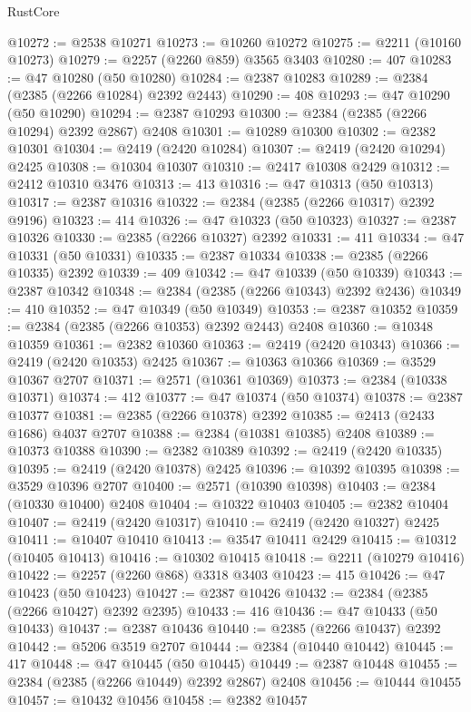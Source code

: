 \begin{lexlean}{RustCore}
\begin{coremodule}
@10272 := @2538 @10271
@10273 := @10260 @10272
@10275 := @2211 (@10160 @10273)
@10279 := @2257 (@2260 @859) @3565 @3403
@10280 := 407
@10283 := @47 @10280 (@50 @10280)
@10284 := @2387 @10283
@10289 := @2384 (@2385 (@2266 @10284) @2392 @2443)
@10290 := 408
@10293 := @47 @10290 (@50 @10290)
@10294 := @2387 @10293
@10300 := @2384 (@2385 (@2266 @10294) @2392 @2867) @2408
@10301 := @10289 @10300
@10302 := @2382 @10301
@10304 := @2419 (@2420 @10284)
@10307 := @2419 (@2420 @10294) @2425
@10308 := @10304 @10307
@10310 := @2417 @10308 @2429
@10312 := @2412 @10310 @3476
@10313 := 413
@10316 := @47 @10313 (@50 @10313)
@10317 := @2387 @10316
@10322 := @2384 (@2385 (@2266 @10317) @2392 @9196)
@10323 := 414
@10326 := @47 @10323 (@50 @10323)
@10327 := @2387 @10326
@10330 := @2385 (@2266 @10327) @2392
@10331 := 411
@10334 := @47 @10331 (@50 @10331)
@10335 := @2387 @10334
@10338 := @2385 (@2266 @10335) @2392
@10339 := 409
@10342 := @47 @10339 (@50 @10339)
@10343 := @2387 @10342
@10348 := @2384 (@2385 (@2266 @10343) @2392 @2436)
@10349 := 410
@10352 := @47 @10349 (@50 @10349)
@10353 := @2387 @10352
@10359 := @2384 (@2385 (@2266 @10353) @2392 @2443) @2408
@10360 := @10348 @10359
@10361 := @2382 @10360
@10363 := @2419 (@2420 @10343)
@10366 := @2419 (@2420 @10353) @2425
@10367 := @10363 @10366
@10369 := @3529 @10367 @2707
@10371 := @2571 (@10361 @10369)
@10373 := @2384 (@10338 @10371)
@10374 := 412
@10377 := @47 @10374 (@50 @10374)
@10378 := @2387 @10377
@10381 := @2385 (@2266 @10378) @2392
@10385 := @2413 (@2433 @1686) @4037 @2707
@10388 := @2384 (@10381 @10385) @2408
@10389 := @10373 @10388
@10390 := @2382 @10389
@10392 := @2419 (@2420 @10335)
@10395 := @2419 (@2420 @10378) @2425
@10396 := @10392 @10395
@10398 := @3529 @10396 @2707
@10400 := @2571 (@10390 @10398)
@10403 := @2384 (@10330 @10400) @2408
@10404 := @10322 @10403
@10405 := @2382 @10404
@10407 := @2419 (@2420 @10317)
@10410 := @2419 (@2420 @10327) @2425
@10411 := @10407 @10410
@10413 := @3547 @10411 @2429
@10415 := @10312 (@10405 @10413)
@10416 := @10302 @10415
@10418 := @2211 (@10279 @10416)
@10422 := @2257 (@2260 @868) @3318 @3403
@10423 := 415
@10426 := @47 @10423 (@50 @10423)
@10427 := @2387 @10426
@10432 := @2384 (@2385 (@2266 @10427) @2392 @2395)
@10433 := 416
@10436 := @47 @10433 (@50 @10433)
@10437 := @2387 @10436
@10440 := @2385 (@2266 @10437) @2392
@10442 := @5206 @3519 @2707
@10444 := @2384 (@10440 @10442)
@10445 := 417
@10448 := @47 @10445 (@50 @10445)
@10449 := @2387 @10448
@10455 := @2384 (@2385 (@2266 @10449) @2392 @2867) @2408
@10456 := @10444 @10455
@10457 := @10432 @10456
@10458 := @2382 @10457

\end{coremodule}
\end{lexlean}
